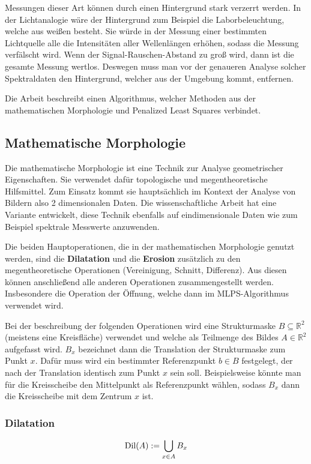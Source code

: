 \documentclass{article}
\newcommand{\R}[0]{\mathbb{R}}
\begin{document}
Messungen dieser Art können durch einen Hintergrund stark verzerrt werden. In der Lichtanalogie wäre der Hintergrund zum Beispiel die Laborbeleuchtung, welche aus weißen besteht. 
Sie würde in der Messung einer bestimmten Lichtquelle alle die Intensitäten aller Wellenlängen erhöhen, sodass die Messung verfälscht wird.
Wenn der Signal-Rauschen-Abstand zu groß wird, dann ist die gesamte Messung wertlos. Deswegen muss man vor der genaueren Analyse solcher Spektraldaten den Hintergrund, welcher aus der Umgebung kommt, entfernen.

Die Arbeit beschreibt einen Algorithmus, welcher Methoden aus der mathematischen Morphologie und Penalized Least Squares verbindet.

\subsection{Mathematische Morphologie}
Die mathematische Morphologie ist eine Technik zur Analyse geometrischer Eigenschaften.
Sie verwendet dafür topologische und megentheoretische Hilfsmittel. Zum Einsatz kommt sie hauptsächlich im Kontext der Analyse von Bildern also 2 dimensionalen Daten.
Die wissenschaftliche Arbeit hat eine Variante entwickelt, diese Technik ebenfalls auf eindimensionale Daten wie zum Beispiel spektrale Messwerte anzuwenden.

Die beiden Hauptoperationen, die in der mathematischen Morphologie genutzt werden, sind die \textbf{Dilatation} und die \textbf{Erosion} zusätzlich zu den megentheoretische Operationen (Vereinigung, Schnitt, Differenz).
Aus diesen können anschließend alle anderen Operationen zusammengestellt werden. Insbesondere die Operation der Öffnung, welche dann im MLPS-Algorithmus verwendet wird.


Bei der beschreibung der folgenden Operationen wird eine Strukturmaske $B \subseteq \R^2$ (meistens eine Kreisfläche) verwendet und welche als Teilmenge des Bildes $A \in \R^2$ aufgefasst wird.
$B_x$ bezeichnet dann die Translation der Strukturmaske zum Punkt $x$. Dafür muss wird ein bestimmter Referenzpunkt $b \in B$ festgelegt, der nach der Translation identisch zum Punkt $x$ sein soll.
Beispielsweise könnte man für die Kreisscheibe den Mittelpunkt als Referenzpunkt wählen, sodass $B_x$ dann die Kreisscheibe mit dem Zentrum $x$ ist.

\subsubsection{Dilatation}
\begin{equation}
    {\rm Dil}(A) := \bigcup\limits_{x \in A} B_x
\end{equation}
\end{document}
